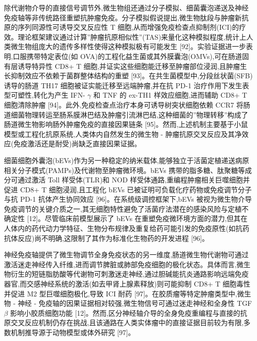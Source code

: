 除代谢物介导的直接信号调节外,微生物组还通过分子模拟、细菌囊泡递送及神经免疫轴等非传统路径重塑抗肿瘤免疫。分子模拟假说提出,微生物肽段与肿瘤新抗原的序列同源性可诱导交叉反应性 T 细胞,从而增强免疫检查点抑制剂(ICI)的疗效。理论框架建议通过计算''肿瘤抗原相似性''(TAS)来量化这种模拟程度,统计上人类微生物组庞大的遗传多样性使得这种模拟极有可能发生 {[}92{]}。实验证据进一步表明,口服携带特定表位(如 OVA)的工程化益生菌或其外膜囊泡(OMVs),可在肠道固有层诱导特异性 CD8+ T 细胞,并证实这些细胞能迁移至肿瘤部位浸润,且肿瘤生长抑制效应不依赖于菌群整体结构的重塑 {[}93{]}。在共生菌模型中,分段丝状菌(SFB)诱导的肠道 TH17 细胞被证实能迁移至远端肿瘤,并在抗 PD-1 治疗作用下发生表型可塑性,转化为产生 IFN- \(\gamma\) 和 TNF 的 ex-TH1 样效应细胞,进而辅助 CD8+ T 细胞清除肿瘤 {[}94{]}。此外,免疫检查点治疗本身可诱导树突状细胞依赖 CCR7 将肠道细菌物理转运至肠系膜淋巴结及肿瘤引流淋巴结,这种细菌的''物理转移''构成了肠道微生物影响肠外肿瘤免疫的直接因果链条 {[}95{]}。然而,上述机制主要基于小鼠模型或工程化抗原系统,人类体内自然发生的微生物 - 肿瘤抗原交叉反应及其净效应(免疫激活还是耐受)尚缺乏直接因果证据。

细菌细胞外囊泡(bEVs)作为另一种稳定的纳米载体,能够独立于活菌定植递送病原相关分子模式(PAMPs)及代谢物至肿瘤微环境。bEVs 携带的脂多糖、肽聚糖等成分可通过激活 Toll 样受体(TLR)和 NOD 样受体通路,重编程肿瘤相关巨噬细胞并促进 CD8+ T 细胞浸润,且工程化 bEVs 已被证明可负载化疗药物或免疫调节分子与抗 PD-1 抗体产生协同效应 {[}96{]}。在系统级调控框架下,bEVs 被视为微生物介导免疫调节的关键介质之一,其无细胞特性避免了活菌疗法潜在的感染风险与定植不确定性 {[}12{]}。尽管临床前模型展示了 bEVs 在重塑免疫微环境方面的潜力,但其在人体内的药代动力学特征、生物分布规律及重复给药可能引发的免疫原性(如抗药抗体反应)尚不明确,这限制了其作为标准化生物药的开发进程 {[}96{]}。

神经免疫轴提供了微生物调节全身免疫状态的另一维度,肠道微生物代谢物可通过激活迷走神经传入纤维,进而调节脾脏或肺部免疫细胞的极化状态。具体而言,微生物衍生的短链脂肪酸等代谢物可刺激迷走神经,通过胆碱能抗炎通路影响远端免疫器官,而交感神经系统的激活(如去甲肾上腺素释放)则可能抑制 CD8+ T 细胞毒性并促进 M2 型巨噬细胞极化,导致 ICI 耐药 {[}97{]}。在胶质瘤等特定肿瘤类型中,微生物 - 神经 - 免疫轴的因果证据相对较强,微生物信号可通过迷走神经和全身性 TGF \(\beta\) 影响小胶质细胞功能 {[}12{]}。然而,区分神经轴介导的全身免疫重编程与直接的抗原交叉反应机制仍存在挑战,且该通路在人类实体瘤中的直接证据目前较为有限,多数机制推导源于动物模型或体外研究 {[}97{]}。

